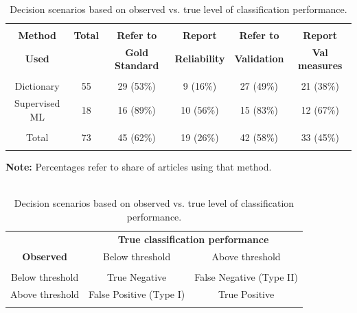 \documentclass[man, 12pt, a4paper, nolmodern, noextraspace]{apa6}
\begin{document}
\begin{table}[!htbp] \centering 
	\begin{minipage}{\textwidth}
    \centering
  \caption{\\ Results of the systematic literature review} 
  \label{tab:Table1} 
\begin{tabular}{@{\extracolsep{5pt}} cccccc} 
\\[-1.8ex]\hline 
\hline \\[-1.8ex] 
 \textbf{Method} & \textbf{Total} & \textbf{Refer to} &  \textbf{Report} & \textbf{Refer to} & \textbf{Report} \\ 
 \textbf{Used} & & \textbf{Gold Standard} & \textbf{Reliability} & \textbf{Validation} & \textbf{Val measures} \\
\hline \\[-1.8ex] 
 Dictionary & 55 & 29 (53\%) & 9 (16\%) & 27 (49\%) & 21 (38\%) \\
 Supervised ML & 18 & 16 (89\%) & 10 (56\%) & 15 (83\%) & 12 (67\%) \\
\hline \\[-1.8ex] 
 Total & 73 & 45 (62\%) & 19 (26\%) & 42 (58\%) & 33 (45\%) \\ 
\hline \\[-1.8ex]  
\end{tabular} 
\begin{tablenotes}
\small \vspace{0.15in}
\textbf{Note:} Percentages refer to share of articles using that method.\\ 
\end{tablenotes}
 	\end{minipage}
\bigbreak
\vspace{0.5in}
 	\begin{minipage}{\textwidth}
    \centering
\caption{\\ Decision scenarios based on observed vs. true level of classification performance.} 
  \label{tab:Table2} 
  \begin{tabular}{ ccc}
\toprule
      \multicolumn{1}{c}{} & \multicolumn{2}{c}{\textbf{True classification performance}} \\
\cline{2-3}
   \textbf{Observed} & Below threshold & Above threshold \\
\hline \\[-1.8ex] 
 Below threshold & True Negative & False Negative (Type II) \\ 
 Above threshold & False Positive (Type I) & True Positive \\ 
\hline \\[-1.8ex]  
  \end{tabular}
  \end{minipage}
\end{table} 
\end{document}
